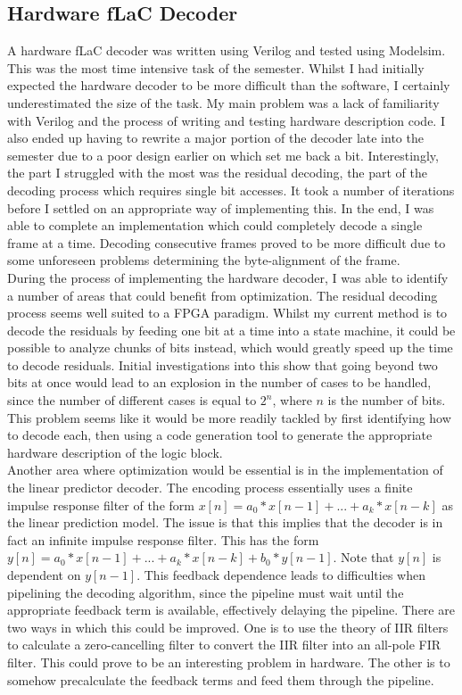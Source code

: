 \documentclass[12pt]{scrartcl}
\begin{document}
  \subsection{Hardware fLaC Decoder}
  A hardware fLaC decoder was written using Verilog and tested using Modelsim. This was the most time intensive task of the semester. Whilst I had initially expected the hardware decoder to be more difficult than the software, I certainly underestimated the size of the task. My main problem was a lack of familiarity with Verilog and the process of writing and testing hardware description code. I also ended up having to rewrite a major portion of the decoder late into the semester due to a poor design earlier on which set me back a bit. Interestingly, the part I struggled with the most was the residual decoding, the part of the decoding process which requires single bit accesses. It took a number of iterations before I settled on an appropriate way of implementing this. In the end, I was able to complete an implementation which could completely decode a single frame at a time. Decoding consecutive frames proved to be more difficult due to some unforeseen problems determining the byte-alignment of the frame.\\
  
  During the process of implementing the hardware decoder, I was able to identify a number of areas that could benefit from optimization. The residual decoding process seems well suited to a FPGA paradigm. Whilst my current method is to decode the residuals by feeding one bit at a time into a state machine, it could be possible to analyze chunks of bits instead, which would greatly speed up the time to decode residuals. Initial investigations into this show that going beyond two bits at once would lead to an explosion in the number of cases to be handled, since the number of different cases is equal to \(2^{n}\), where \(n\) is the number of bits. This problem seems like it would be more readily tackled by first identifying how to decode each, then using a code generation tool to generate the appropriate hardware description of the logic block. \\
      
  Another area where optimization would be essential is in the implementation of the linear predictor decoder. The encoding process essentially uses a finite impulse response filter of the form \(x[n] = a_0*x[n-1] + ... + a_k*x[n-k]\) as the linear prediction model. The issue is that this implies that the decoder is in fact an infinite impulse response filter. This has the form \(y[n] = a_0*x[n - 1] + ... + a_k*x[n-k] + b_0*y[n - 1]\). Note that \(y[n]\) is dependent on \(y[n-1]\). This feedback dependence leads to difficulties when pipelining the decoding algorithm, since the pipeline must wait until the appropriate feedback term is available, effectively delaying the pipeline. There are two ways in which this could be improved. One is to use the theory of IIR filters to calculate a zero-cancelling filter to convert the IIR filter into an all-pole FIR filter. This could prove to be an interesting problem in hardware. The other is to somehow precalculate the feedback terms and feed them through the pipeline. \\ 
      
\end{document}

